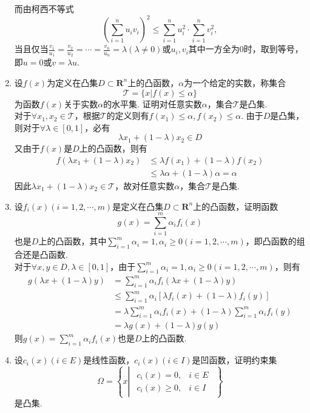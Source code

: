 \begin{enumerate}
    而由柯西不等式\[\left(\sum\limits_{i=1}^n u_iv_i\right)^2 \leqslant \sum\limits_{i=1}^n u_i^2 \cdot \sum\limits_{i=1}^n v_i^2,\]
    当且仅当$\displaystyle \frac{v_1}{u_1}=\frac{v_2}{u_2}=\cdots=\frac{v_n}{u_n} = \lambda (\lambda \neq 0)$或$u_i,v_i$其中一方全为0时，取到等号，即$u=0$或$v = \lambda u$.
    \item 设$f(x)$为定义在凸集$D \subset \textbf{R}^n$上的凸函数，$\alpha$为一个给定的实数，称集合\[\mathcal{T}=\{x|f(x) \leqslant \alpha\}\]为函数$f(x)$关于实数$\alpha$的水平集. 证明对任意实数$\alpha$，集合$\mathcal{T}$是凸集.\\
    \pro 对于$\forall x_1,x_2 \in \mathcal{T}$，根据$\mathcal{T}$的定义则有$f(x_1) \leqslant \alpha,f(x_2) \leqslant \alpha$. 由于$D$是凸集，则对于$\forall \lambda \in [0,1]$，必有\[\lambda x_1 + (1-\lambda)x_2 \in D\]
    又由于$f(x)$是$D$上的凸函数，则有
    \begin{align*}
        f\left(\lambda x_1 + (1-\lambda)x_2\right) & \leqslant \lambda f(x_1) + (1-\lambda)f(x_2)\\
        & \leqslant \lambda \alpha + (1-\lambda)\alpha = \alpha
    \end{align*}
    因此$\lambda x_1 + (1-\lambda)x_2 \in \mathcal{T}$，故对任意实数$\alpha$，集合$\mathcal{T}$是凸集.
    \item 设$f_i(x)(i=1,2,\cdots,m)$是定义在凸集$D \subset \textbf{R}^n$上的凸函数，证明函数\[g(x)=\sum\limits_{i=1}^m \alpha_if_i(x)\]也是$D$上的凸函数，其中$\displaystyle \sum\limits_{i=1}^m \alpha_i=1,\alpha_i \geqslant 0(i=1,2,\cdots,m)$，即凸函数的组合还是凸函数.\\
    \pro 对于$\forall x,y \in D,\lambda \in [0,1]$，由于$\displaystyle \sum\limits_{i=1}^m \alpha_i=1,\alpha_i \geqslant 0(i=1,2,\cdots,m)$，则有
    \begin{align*}
        g(\lambda x+(1-\lambda)y) & = \sum\limits_{i=1}^m \alpha_if_i(\lambda x+(1-\lambda)y)\\
        & \leqslant \sum\limits_{i=1}^m \alpha_i[\lambda f_i(x)+(1-\lambda)f_i(y)]\\
        &=\lambda \sum\limits_{i=1}^m \alpha_if_i(x)+(1-\lambda)\sum\limits_{i=1}^m \alpha_if_i(y)\\
        &=\lambda g(x) + (1-\lambda) g(y)
    \end{align*}
    则$\displaystyle g(x)=\sum\limits_{i=1}^m \alpha_if_i(x)$也是$D$上的凸函数.
    \item 设$c_i(x)(i \in E)$是线性函数，$c_i(x)(i \in I)$是凹函数，证明约束集\[\varOmega=\left\{x\left|\begin{array}{cc}\begin{matrix}c_i(x)=0, & i \in E\\c_i(x)\geqslant 0, & i \in I \end{matrix}\end{array}\right.\right\}\]是凸集.\\

\end{enumerate}

